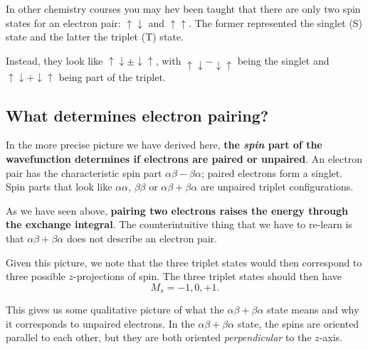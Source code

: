 \documentclass[a4paper]{tufte-handout}
\theoremstyle{definition}
\begin{document}
In other chemistry courses you may hev been taught that there are only two spin states for an electron pair: $\uparrow \downarrow$ and $\uparrow \uparrow$. The
former represented the singlet (S) state and the latter the triplet (T) state.

Instead, they look like $\uparrow \downarrow \pm \downarrow \uparrow$, with $\uparrow \downarrow - \downarrow \uparrow$ being the singlet and
$\uparrow \downarrow + \downarrow \uparrow$ being part of the triplet.

\subsection*{What determines electron pairing?}

In the more precise picture we have derived here, \textbf{the \textit{spin} part of the wavefunction determines 
if electrons are paired or unpaired}. An electron pair has the characteristic spin part $\alpha \beta - \beta \alpha$; paired 
electrons form a singlet. Spin parts that look like $\alpha \alpha$, $\beta \beta$ or $\alpha \beta + \beta \alpha$ are unpaired triplet configurations.

As we have seen above,  \textbf{pairing two electrons raises the energy through the exchange integral}. The
counterintuitive thing that we have to re-learn is that $\alpha \beta + \beta \alpha$ does not describe an electron pair.

Given this picture, we note that the three triplet states would then correspond to three possible $z$-projections of spin. The three triplet states should then have
\begin{equation*}
  M_s = -1, 0, +1.
\end{equation*}

This gives us some qualitative picture of what the $\alpha \beta + \beta \alpha$ state means and why it corresponds to unpaired electrons. In the
$\alpha \beta + \beta \alpha$ state, the spins are oriented parallel to each other, but they are both oriented \textit{perpendicular} to the $z$-axis.



\end{document}

